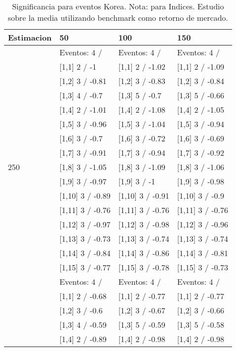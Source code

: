 \begin{table}

\caption{Significancia para eventos Korea. Nota: para Indices. Estudio sobre la media utilizando benchmark como retorno de mercado.}
\centering
\begin{tabular}[t]{llll}
\toprule
Estimacion & 50 & 100 & 150\\
\midrule
 & Eventos:  4 / & Eventos:  4 / & Eventos:  4 /\\
 & {}[1,1] 2  / -1 & {}[1,1] 2  / -1.02 & {}[1,1] 2  / -1.09\\
 & {}[1,2] 3  / -0.81 & {}[1,2] 3  / -0.83 & {}[1,2] 3  / -0.84\\
 & {}[1,3] 4  / -0.7 & {}[1,3] 5  / -0.7 & {}[1,3] 5  / -0.66\\
 & {}[1,4] 2  / -1.01 & {}[1,4] 2  / -1.08 & {}[1,4] 2  / -1.05\\
\addlinespace
 & {}[1,5] 3  / -0.96 & {}[1,5] 3  / -1.04 & {}[1,5] 3  / -0.94\\
 & {}[1,6] 3  / -0.7 & {}[1,6] 3  / -0.72 & {}[1,6] 3  / -0.69\\
 & {}[1,7] 3  / -0.91 & {}[1,7] 3  / -0.94 & {}[1,7] 3  / -0.92\\
250 & {}[1,8] 3  / -1.05 & {}[1,8] 3  / -1.09 & {}[1,8] 3  / -1.06\\
 & {}[1,9] 3  / -0.97 & {}[1,9] 3  / -1 & {}[1,9] 3  / -0.98\\
\addlinespace
 & {}[1,10] 3  / -0.89 & {}[1,10] 3  / -0.91 & {}[1,10] 3  / -0.9\\
 & {}[1,11] 3  / -0.76 & {}[1,11] 3  / -0.76 & {}[1,11] 3  / -0.76\\
 & {}[1,12] 3  / -0.97 & {}[1,12] 3  / -0.98 & {}[1,12] 3  / -0.96\\
 & {}[1,13] 3  / -0.73 & {}[1,13] 3  / -0.74 & {}[1,13] 3  / -0.74\\
 & {}[1,14] 3  / -0.84 & {}[1,14] 3  / -0.86 & {}[1,14] 3  / -0.81\\
\addlinespace
 & {}[1,15] 3  / -0.77 & {}[1,15] 3  / -0.78 & {}[1,15] 3  / -0.73\\
 & Eventos:  4 / & Eventos:  4 / & Eventos:  4 /\\
 & {}[1,1] 2  / -0.68 & {}[1,1] 2  / -0.77 & {}[1,1] 2  / -0.77\\
 & {}[1,2] 3  / -0.6 & {}[1,2] 3  / -0.67 & {}[1,2] 3  / -0.66\\
 & {}[1,3] 4  / -0.59 & {}[1,3] 5  / -0.59 & {}[1,3] 5  / -0.58\\
\addlinespace
 & {}[1,4] 2  / -0.89 & {}[1,4] 2  / -0.98 & {}[1,4] 2  / -0.98\\

\end{tabular}
\end{table}
